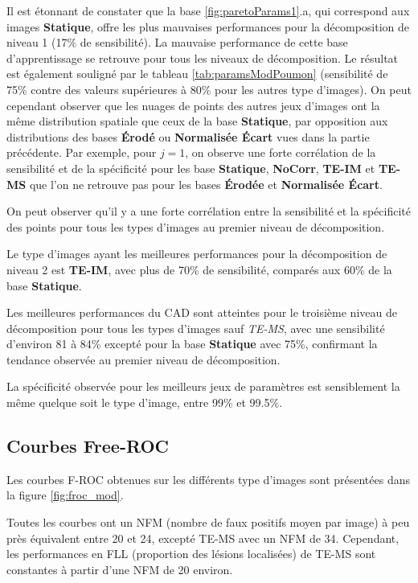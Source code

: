 Il est étonnant de constater que la base \ref{fig:paretoParams1}.a, qui correspond aux images \textbf{Statique}, offre les plus mauvaises performances pour la décomposition de niveau 1 (17\% de sensibilité). La mauvaise performance de cette base d'apprentissage se retrouve pour tous les niveaux de décomposition. Le résultat est également souligné par le tableau \ref{tab:paramsModPoumon} (sensibilité de 75\% contre des valeurs supérieures à 80\% pour les autres type d'images). On peut cependant observer que les nuages de points des autres jeux d'images ont la même distribution spatiale que ceux de la base \textbf{Statique}, par opposition aux distributions des bases \textbf{Érodé} ou \textbf{Normalisée Écart} vues dans la partie précédente. Par exemple, pour $j=1$, on observe une forte corrélation de la sensibilité et de la spécificité pour les base \textbf{Statique}, \textbf{NoCorr}, \textbf{TE-IM} et \textbf{TE-MS} que l'on ne retrouve pas pour les bases \textbf{Érodée} et \textbf{Normalisée Écart}. 

On peut observer qu'il y a une forte corrélation entre la sensibilité et la spécificité des points pour tous les types d'images au premier niveau de décomposition.

Le type d'images ayant les meilleures performances pour la décomposition de niveau 2 est \textbf{TE-IM}, avec plus de 70\% de sensibilité, comparés aux 60\% de la base \textbf{Statique}. 

Les meilleures performances du CAD sont atteintes pour le troisième niveau de décomposition pour tous les types d'images sauf \emph{TE-MS}, avec une sensibilité d'environ 81 à 84\% excepté pour la base \textbf{Statique} avec 75\%, confirmant la tendance observée au premier niveau de décomposition.

La spécificité observée pour les meilleurs jeux de paramètres est sensiblement la même quelque soit le type d'image, entre 99\% et 99.5\%.

\subsection{Courbes Free-ROC}

Les courbes F-ROC obtenues sur les différents type d'images sont présentées dans la figure \ref{fig:froc_mod}. 

Toutes les courbes ont un NFM (nombre de faux positifs moyen par image) à peu près équivalent entre 20 et 24, excepté TE-MS avec un NFM de 34. Cependant, les performances en FLL (proportion des lésions localisées) de TE-MS sont constantes à partir d'une NFM de 20 environ. 

